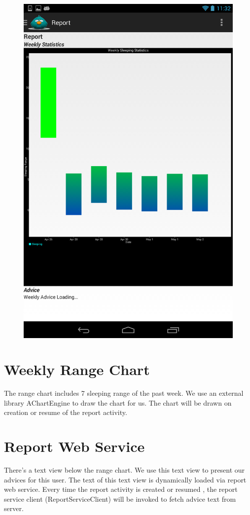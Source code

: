\documentclass[14pt]{extreport}
\begin{document}
\begin{figure}[h]
\begin{center}
\includegraphics[width=5in]{report}
\end{center}
\end{figure}

\section{Weekly Range Chart}
The range chart includes 7 sleeping range of the past week. We use an external library AChartEngine to draw the chart for us. The chart will be drawn on creation or resume of the report activity.

\section{Report Web Service}
There's a text view below the range chart. We use this text view to present our advices for this user. The text of this text view is dynamically loaded via report web service. Every time the report activity is created or resumed , the report service client (ReportServiceClient) will be invoked to fetch advice text from server. 
\end{document}
